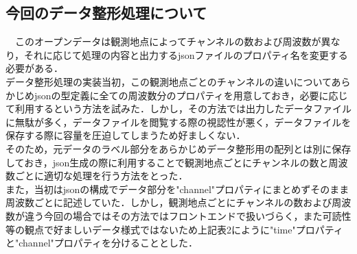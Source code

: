 
\subsection{今回のデータ整形処理について}
　このオープンデータは観測地点によってチャンネルの数および周波数が異なり，それに応じて処理の内容と出力するjsonファイルのプロパティ名を変更する必要がある．\\
 データ整形処理の実装当初，この観測地点ごとのチャンネルの違いについてあらかじめjsonの型定義に全ての周波数分のプロパティを用意しておき，必要に応じて利用するという方法を試みた．しかし，その方法では出力したデータファイルに無駄が多く，データファイルを閲覧する際の視認性が悪く，データファイルを保存する際に容量を圧迫してしまうため好ましくない．\\
 そのため，元データのラベル部分をあらかじめデータ整形用の配列とは別に保存しておき，json生成の際に利用することで観測地点ごとにチャンネルの数と周波数ごとに適切な処理を行う方法をとった．\\
 また，当初はjsonの構成でデータ部分を"channel"プロパティにまとめずそのまま周波数ごとに記述していた．しかし，観測地点ごとにチャンネルの数および周波数が違う今回の場合ではその方法ではフロントエンドで扱いづらく，また可読性等の観点で好ましいデータ様式ではないため上記表2にように"time"プロパティと"channel"プロパティを分けることとした．
